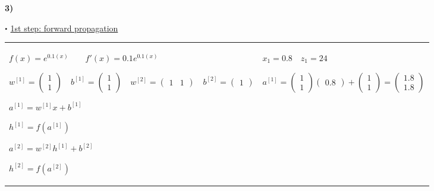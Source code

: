 \documentclass[11pt,a4paper]{article}
\newcommand\sbullet[1][.5]{\mathbin{\vcenter{\hbox{\scalebox{#1}{$\bullet$}}}}}
\begin{document}
\begin{flushleft}
  \textbf{3)}
  \par $\sbullet$ \underline{1st step: forward propagation} \par
  \small
  \begin{tabularx}{1.09\textwidth}{X X}
    \vspace{1.5mm} %
    $ f(x) = e^{0.1(x)} \quad\quad f'(x) = 0.1e^{0.1(x)} $ \par \vspace{1mm}
    $ w^{[1]} = \begin{pmatrix} 1 \\ 1 \end{pmatrix} \quad b^{[1]} = \begin{pmatrix} 1 \\ 1 \end{pmatrix} \quad w^{[2]} = \begin{pmatrix} 1 & 1 \end{pmatrix} \quad b^{[2]} = \begin{pmatrix} 1 \end{pmatrix} $ \par \vspace{1mm}
    $ a^{[1]} = w^{[1]}x + b^{[1]} $ \par \vspace{1mm}
    $ h^{[1]} = f(a^{[1]}) $ \par \vspace{1mm}
    $ a^{[2]} = w^{[2]}h^{[1]} + b^{[2]} $ \par \vspace{1mm}
    $ h^{[2]} = f(a^{[2]}) $ \par \vspace{1mm}
     & %
    $ \boxed{x_1 = 0.8} \quad z_1 = 24 $ \par \vspace{1mm}
    $ a^{[1]} = \begin{pmatrix} 1 \\ 1 \end{pmatrix} \begin{pmatrix} 0.8 \end{pmatrix} + \begin{pmatrix} 1 \\ 1 \end{pmatrix} = \begin{pmatrix} 1.8 \\ 1.8 \end{pmatrix} $ \par \vspace{1mm}

\end{tabularx}
\end{flushleft}
\end{document}
